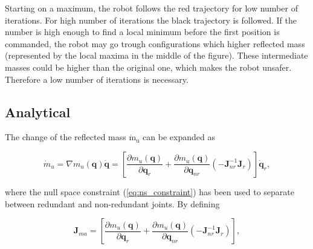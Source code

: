 Starting on a maximum, the robot  follows the red trajectory for low number of iterations. For high number of iterations the black trajectory is followed. If the number is high enough to find a local minimum before the first position is commanded, the robot may go trough configurations which higher reflected mass (represented by the local maxima in the middle of the figure). These intermediate masses could be higher than the original one, which makes the robot unsafer. Therefore a low number of iterations is necessary.





















\label{subsec:2Dminim}




\subsection{Analytical}
\label{sec:analytical}

The change of the reflected mass $\mathrm{{\dot{m}_u}}$ can be expanded as

\begin{equation}
{\dot{m}_u}=\nabla m_u(\mathbf{q}) \dot{\mathbf{q}} = \left[ \frac{\partial {m_u(\mathbf{q})}}{\partial{\mathbf{q}_{r}}} + \frac{\partial {m_u(\mathbf{q})}}{\partial{\mathbf{q}_{nr}}}  (- \mathbf{J}_{nr}^{-1} \mathbf{J}_r) \right ]  \mathbf{\dot{q}}_r ,
\label{eq:mass_expanded}
\end{equation}

where the null space constraint (\ref{eq:ns_constraint}) has been used to separate between redundant and non-redundant joints. By defining

\begin{equation}
\mathbf{J}_{ma} = \left[ \frac{\partial {m_u(\mathbf{q})}}{\partial{\mathbf{q}_{r}}} + \frac{\partial {m_u(\mathbf{q})}}{\partial{\mathbf{q}_{nr}}}  (- \mathbf{J}_{nr}^{-1} \mathbf{J}_r) \right ] ,
\label{eq:jma}
\end{equation}

